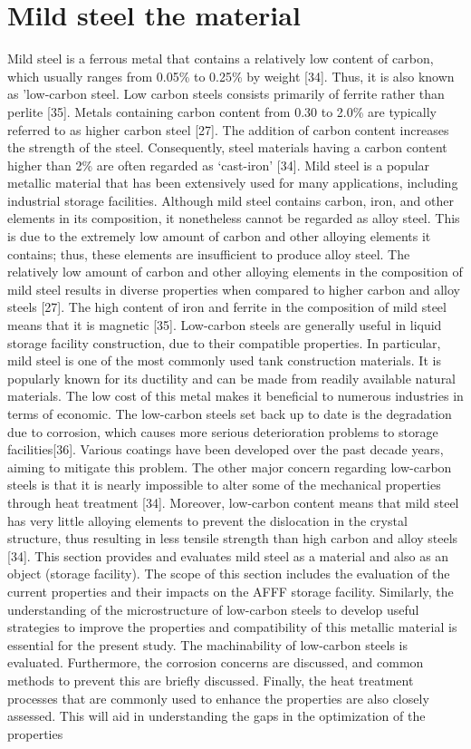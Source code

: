 \documentclass[12pt]{report}
\begin{document}
\section{Mild steel the material}
Mild steel is a ferrous metal that contains a relatively low content of carbon, which usually ranges from 0.05\% to 0.25\% by weight [34]. Thus, it is also known as 'low-carbon steel.  Low carbon steels consists primarily of ferrite rather than perlite [35]. Metals containing carbon content from 0.30 to 2.0\% are typically referred to as higher carbon steel [27]. The addition of carbon content increases the strength of the steel. Consequently, steel materials having a carbon content higher than 2\% are often regarded as ‘cast-iron' [34].  Mild steel is a popular metallic material that has been extensively used for many applications, including industrial storage facilities.
Although mild steel contains carbon, iron, and other elements in its composition, it nonetheless cannot be regarded as alloy steel. This is due to the extremely low amount of carbon and other alloying elements it contains; thus, these elements are insufficient to produce alloy steel. The relatively low amount of carbon and other alloying elements in the composition of mild steel results in diverse properties when compared to higher carbon and alloy steels [27]. The high content of iron and ferrite in the composition of mild steel means that it is magnetic [35].
Low-carbon steels are generally useful in liquid storage facility construction, due to their compatible properties. In particular, mild steel is one of the most commonly used tank construction materials. It is popularly known for its ductility and can be made from readily available natural materials. The low cost of this metal makes it beneficial to numerous industries in terms of economic.
The low-carbon steels set back up to date is the degradation due to corrosion, which causes more serious deterioration problems to storage facilities[36]. Various coatings have been developed over the past decade years, aiming to mitigate this problem. The other major concern regarding low-carbon steels is that it is nearly impossible to alter some of the mechanical properties through heat treatment [34]. Moreover, low-carbon content means that mild steel has very little alloying elements to prevent the dislocation in the crystal structure, thus resulting in less tensile strength than high carbon and alloy steels [34].
This section provides and evaluates mild steel as a material and also as an object (storage facility). The scope of this section includes the evaluation of the current properties and their impacts on the AFFF storage facility. Similarly, the understanding of the microstructure of low-carbon steels to develop useful strategies to improve the properties and compatibility of this metallic material is essential for the present study. The machinability of low-carbon steels is evaluated. Furthermore, the corrosion concerns are discussed, and common methods to prevent this are briefly discussed. Finally, the heat treatment processes that are commonly used to enhance the properties are also closely assessed. This will aid in understanding the gaps in the optimization of the properties
\end{document}
